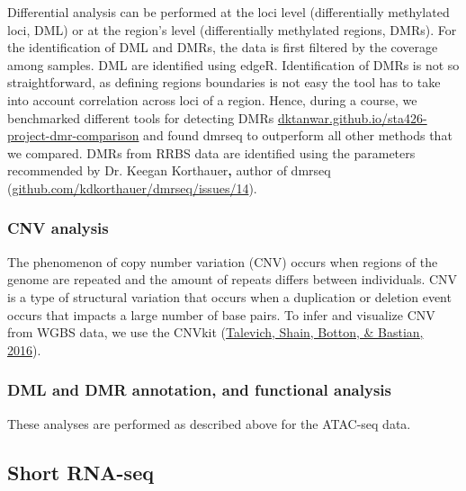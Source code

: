 \documentclass[12pt,twoside]{reedthesis}
\begin{document}
Differential analysis can be performed at the loci level (differentially
methylated loci, DML) or at the region's level (differentially
methylated regions, DMRs). For the identification of DML and DMRs, the
data is first filtered by the coverage among samples. DML are identified
using edgeR. Identification of DMRs is not so straightforward, as
defining regions boundaries is not easy the tool has to take into
account correlation across loci of a region. Hence, during a course, we
benchmarked different tools for detecting DMRs
\href{https://dktanwar.github.io/sta426-project-dmr-comparison/report/project_report.html}{dktanwar.github.io/sta426-project-dmr-comparison}
and found dmrseq to outperform all other methods that we compared. DMRs
from RRBS data are identified using the parameters recommended by Dr.
Keegan Korthauer\textbf{,} author of dmrseq
(\href{https://github.com/kdkorthauer/dmrseq/issues/14}{github.com/kdkorthauer/dmrseq/issues/14}).

\hypertarget{m3.5.3}{%
\subsubsection*{CNV analysis}\label{m3.5.3}}

The phenomenon of copy number variation (CNV) occurs when regions of the
genome are repeated and the amount of repeats differs between
individuals. CNV is a type of structural variation that occurs when a
duplication or deletion event occurs that impacts a large number of base
pairs. To infer and visualize CNV from WGBS data, we use the CNVkit
(\protect\hyperlink{ref-talevich2016}{Talevich, Shain, Botton, \& Bastian, 2016}).

\hypertarget{m3.5.4}{%
\subsubsection*{DML and DMR annotation, and functional analysis}\label{m3.5.4}}

These analyses are performed as described above for the ATAC-seq data.

\hypertarget{m3.6}{%
\subsection*{Short RNA-seq}\label{m3.6}}
\end{document}
